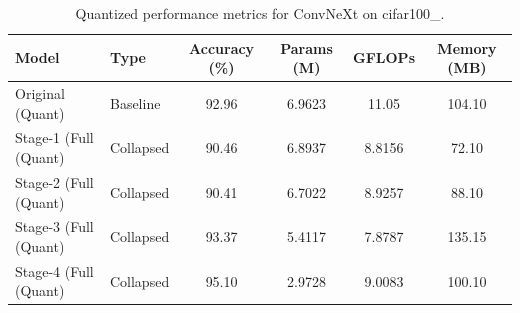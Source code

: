 \begin{table}
\caption{Quantized performance metrics for ConvNeXt on cifar100_.}
\label{tab:ConvNeXt_cifar100__quant}
\begin{tabular}{llcccc}
\toprule
Model & Type & Accuracy (\%) & Params (M) & GFLOPs & Memory (MB) \\
\midrule
Original
(Quant) & Baseline & 92.96 & 6.9623 & 11.05 & 104.10 \\
Stage-1 (Full
(Quant) & Collapsed & 90.46 & 6.8937 & 8.8156 & 72.10 \\
Stage-2 (Full
(Quant) & Collapsed & 90.41 & 6.7022 & 8.9257 & 88.10 \\
Stage-3 (Full
(Quant) & Collapsed & 93.37 & 5.4117 & 7.8787 & 135.15 \\
Stage-4 (Full
(Quant) & Collapsed & 95.10 & 2.9728 & 9.0083 & 100.10 \\
\bottomrule
\end{tabular}
\end{table}
